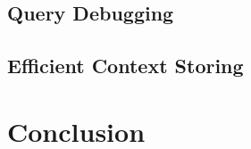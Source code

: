 \documentclass[runningheads]{llncs}
\begin{document}
\subsection{Query Debugging}
\subsection{Efficient Context Storing}

\section{Conclusion} \label{sec:CONCLUSION}

%

\end{document}
